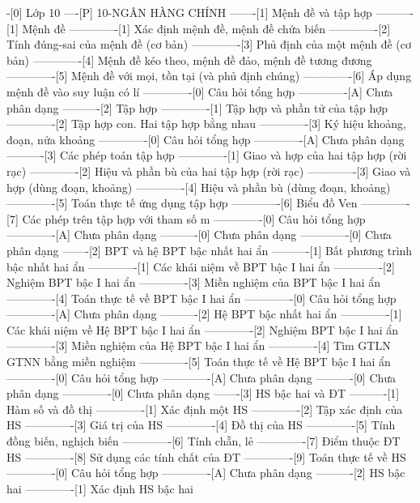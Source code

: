 %
%
-[0] Lớp 10
----[P] 10-NGÂN HÀNG CHÍNH
-------[1] Mệnh đề và tập hợp
----------[1] Mệnh đề
-------------[1] Xác định mệnh đề, mệnh đề chứa biến
-------------[2] Tính đúng-sai của mệnh đề (cơ bản)
-------------[3] Phủ định của một mệnh đề (cơ bản)
-------------[4] Mệnh đề kéo theo, mệnh đề đảo, mệnh đề tương đương
-------------[5] Mệnh đề với mọi, tồn tại (và phủ định chúng)
-------------[6] Áp dụng mệnh đề vào suy luận có lí
-------------[0] Câu hỏi tổng hợp
-------------[A] Chưa phân dạng
----------[2] Tập hợp
-------------[1] Tập hợp và phần tử của tập hợp
-------------[2] Tập hợp con. Hai tập hợp bằng nhau
-------------[3] Ký hiệu khoảng, đoạn, nửa khoảng
-------------[0] Câu hỏi tổng hợp
-------------[A] Chưa phân dạng
----------[3] Các phép toán tập hợp
-------------[1] Giao và hợp của hai tập hợp (rời rạc)
-------------[2] Hiệu và phần bù của hai tập hợp (rời rạc)
-------------[3] Giao và hợp (dùng đoạn, khoảng)
-------------[4] Hiệu và phần bù (dùng đoạn, khoảng)
-------------[5] Toán thực tế ứng dụng tập hợp
-------------[6] Biểu đồ Ven
-------------[7] Các phép trên tập hợp với tham số m
-------------[0] Câu hỏi tổng hợp
-------------[A] Chưa phân dạng
----------[0] Chưa phân dạng
-------------[0] Chưa phân dạng
-------[2] BPT và hệ BPT bậc nhất hai ẩn
----------[1] Bất phương trình bậc nhất hai ẩn
-------------[1] Các khái niệm về BPT bậc I hai ẩn
-------------[2] Nghiệm BPT bậc I hai ẩn
-------------[3] Miền nghiệm của BPT bậc I hai ẩn
-------------[4] Toán thực tế về BPT bậc I hai ẩn
-------------[0] Câu hỏi tổng hợp
-------------[A] Chưa phân dạng
----------[2] Hệ BPT bậc nhất hai ẩn
-------------[1] Các khái niệm về Hệ BPT bậc I hai ẩn
-------------[2] Nghiệm BPT bậc I hai ẩn
-------------[3] Miền nghiệm của Hệ BPT bậc I hai ẩn
-------------[4] Tìm GTLN GTNN bằng miền nghiệm
-------------[5] Toán thực tế về Hệ BPT bậc I hai ẩn
-------------[0] Câu hỏi tổng hợp
-------------[A] Chưa phân dạng
----------[0] Chưa phân dạng
-------------[0] Chưa phân dạng
-------[3] HS bậc hai và ĐT
----------[1] Hàm số và đồ thị
-------------[1] Xác định một HS
-------------[2] Tập xác định của HS
-------------[3] Giá trị của HS
-------------[4] Đồ thị của HS
-------------[5] Tính đồng biến, nghịch biến
-------------[6] Tính chẵn, lẻ
-------------[7] Điểm thuộc ĐT HS
-------------[8] Sử dụng các tính chất của ĐT
-------------[9] Toán thực tế về HS
-------------[0] Câu hỏi tổng hợp
-------------[A] Chưa phân dạng
----------[2] HS bậc hai
-------------[1] Xác định HS bậc hai
